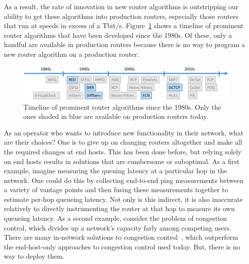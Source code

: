 As a result, the rate of innovation in new router algorithms is outstripping
our ability to get these algorithms into production routers, especially those
routers that run at speeds in excess of a Tbit/s.
Figure~\ref{fig:router_algos} shows a timeline of prominent router algorithms
that have been developed since the 1980s. Of these, only a handful are
available in production routers because there is no way to program a new router
algorithm on a production router.

\begin{figure}
\centering
\includegraphics[width=\columnwidth]{router_alg_timeline.pdf}
\caption{Timeline of prominent router algorithms since the 1980s. Only the ones shaded in blue are available on production routers today.}
\label{fig:router_algos}
\end{figure}

As an operator who wants to introduce new functionality in their network, what
are their choices? One is to give up on changing routers altogether and make
all the required changes at end hosts. This has been done before, but relying
solely on end hosts results in solutions that are cumbersome or suboptimal. As
a first example, imagine measuring the queuing latency at a particular hop in
the network. One could do this by collecting end-to-end ping measurements
between a variety of vantage points and then fusing these measurements together
to estimate per-hop queueing latency. Not only is this indirect, it is also
inaccurate relatively to directly instrumenting the router at that hop to
measure its own queueing latency. As a second example, consider the problem of
congestion control, which divides up a network's capacity farly among competing
users. There are many in-network solutions to congestion control~\cite{xcp,
rcp}, which outperform the end-host-only approaches to congestion control used
today. But, there is no way to deploy them.

